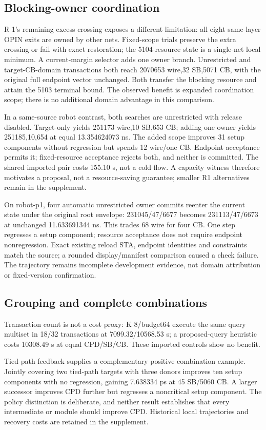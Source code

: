\documentclass[conference,10pt]{IEEEtran}
\begin{document}
\subsection{Blocking-owner coordination}
R 1's remaining excess crossing exposes a different limitation: all eight same-layer OPIN exits are owned by other nets. Fixed-scope trials preserve the extra crossing or fail with exact restoration; the 5104-resource state is a single-net local minimum. A current-margin selector adds one owner branch. Unrestricted and target-CB-domain transactions both reach 2070653 wire,32 SB,5071 CB, with the original full endpoint vector unchanged. Both transfer the blocking resource and attain the 5103 terminal bound. The observed benefit is expanded coordination scope; there is no additional domain advantage in this comparison.

In a same-source robot contrast, both searches are unrestricted with release disabled. Target-only yields 251173 wire,10 SB,653 CB; adding one owner yields 251185,10,654 at equal 13.354624073 ns. The added scope improves 31 setup components without regression but spends 12 wire/one CB. Endpoint acceptance permits it; fixed-resource acceptance rejects both, and neither is committed. The shared imported pair costs 155.10 s, not a cold flow. A capacity witness therefore motivates a proposal, not a resource-saving guarantee; smaller R1 alternatives remain in the supplement.

On robot-p1, four automatic unrestricted owner commits reenter the current state under the original root envelope: 231045/47/6677 becomes 231113/47/6673 at unchanged 11.633691344 ns. This trades 68 wire for four CB. One step regresses a setup component; resource acceptance does not require endpoint nonregression. Exact existing reload STA, endpoint identities and constraints match the source; a rounded display/manifest comparison caused a check failure. The trajectory remains incomplete development evidence, not domain attribution or fixed-version confirmation.

\subsection{Grouping and complete combinations}
Transaction count is not a cost proxy: K 8/budget64 execute the same query multiset in 18/32 transactions at 7099.32/10568.53 s; a proposed-query heuristic costs 10308.49 s at equal CPD/SB/CB. These imported controls show no benefit.

Tied-path feedback supplies a complementary positive combination example. Jointly covering two tied-path targets with three donors improves ten setup components with no regression, gaining 7.638334 ps at 45 SB/5060 CB. A larger successor improves CPD further but regresses a noncritical setup component. The policy distinction is deliberate, and neither result establishes that every intermediate or module should improve CPD. Historical local trajectories and recovery costs are retained in the supplement.
\end{document}
